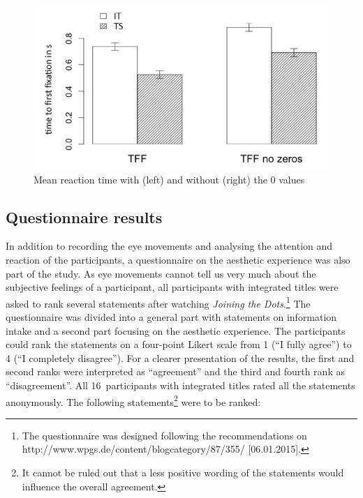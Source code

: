 \documentclass[output=paper]{langsci/langscibook}
\begin{document}
  
\begin{figure} 
  \includegraphics[height=.3\textheight]{figures/Fox10.png}
  \caption{Mean reaction time with (left) and without (right) the 0 values}
  \label{fox:fig:10}
\end{figure}
 

\subsection{Questionnaire results}

In addition to recording the eye movements and analysing the attention and reaction of the participants, a questionnaire on the aesthetic experience was also part of the study. As eye movements cannot tell us very much about the subjective feelings of a participant, all participants with integrated titles were asked to rank several statements after watching \textit{Joining the Dots}.\footnote{The questionnaire was designed following the recommendations on http://www.wpgs.de/content/blogcategory/87/355/ [06.01.2015].} The questionnaire was divided into a general part with statements on information intake and a second part focusing on the aesthetic experience. The participants could rank the statements on a four-point Likert scale from 1 (``I fully agree'') to 4 (``I completely disagree''). For a clearer presentation of the results, the first and second ranks were interpreted as ``agreement'' and the third and fourth rank as ``disagreement''. All 16~participants with integrated titles rated all the statements anonymously. The following statements\footnote{It cannot be ruled out that a less positive wording of the statements would influence the overall agreement.} were to be ranked:
\end{document}
